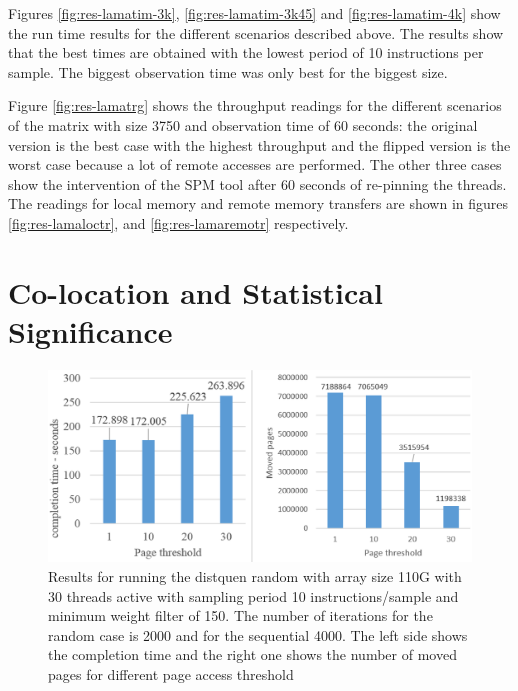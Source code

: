 Figures \ref{fig:res-lamatim-3k}, \ref{fig:res-lamatim-3k45} and \ref{fig:res-lamatim-4k} show the run time results for the different scenarios described above. The results show that the best times are obtained with the lowest period of 10 instructions per sample. The biggest observation time was only best for the biggest size.

Figure \ref{fig:res-lamatrg} shows the throughput readings for the different scenarios of the matrix with size 3750 and observation time of 60 seconds: the original version is the best case with the highest throughput and the flipped version is the worst case because a lot of remote accesses are performed. The other three cases show the intervention of the SPM tool after 60 seconds of re-pinning the threads. The readings for local memory and remote memory transfers are shown in figures \ref{fig:res-lamaloctr}, and \ref{fig:res-lamaremotr} respectively.

\section{Co-location and Statistical Significance}\label{section:resssigni}

\begin{figure}
	\centering
		\includegraphics[width=.8\textwidth]{figures/signi-ran.eps}
		\caption{Results for running the distquen random with array size 110G with 30 threads active with sampling period 10 instructions/sample and minimum weight filter of 150. The number of iterations for the random case is 2000 and for the sequential 4000. The left side shows the completion time and the right one shows the number of moved pages for different page access threshold}
		\label{fig:res-signiran}
\end{figure}


